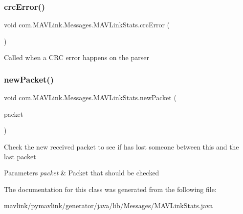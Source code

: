 \subsubsection{\texorpdfstring{crc\+Error()}{crcError()}}
{\footnotesize\ttfamily void com.\+M\+A\+V\+Link.\+Messages.\+M\+A\+V\+Link\+Stats.\+crc\+Error (\begin{DoxyParamCaption}{ }\end{DoxyParamCaption})\hspace{0.3cm}{\ttfamily [inline]}}

Called when a C\+RC error happens on the parser \mbox{\label{classcom_1_1MAVLink_1_1Messages_1_1MAVLinkStats_aa1601a2fcc7ff51f2aa577272337bf8a}} 
\subsubsection{\texorpdfstring{new\+Packet()}{newPacket()}}
{\footnotesize\ttfamily void com.\+M\+A\+V\+Link.\+Messages.\+M\+A\+V\+Link\+Stats.\+new\+Packet (\begin{DoxyParamCaption}\item[{M\+A\+V\+Link\+Packet}]{packet }\end{DoxyParamCaption})\hspace{0.3cm}{\ttfamily [inline]}}

Check the new received packet to see if has lost someone between this and the last packet


\begin{DoxyParams}{Parameters}
{\em packet} & Packet that should be checked \\
\hline
\end{DoxyParams}


The documentation for this class was generated from the following file\+:\begin{DoxyCompactItemize}
\item 
mavlink/pymavlink/generator/java/lib/\+Messages/M\+A\+V\+Link\+Stats.\+java\end{DoxyCompactItemize}
